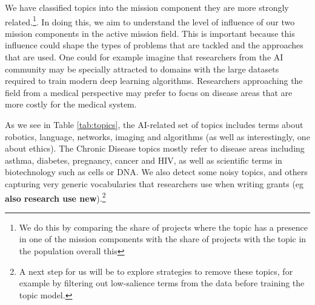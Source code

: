 \documentclass[11pt]{article}
\begin{document}
We have classified topics into the mission component they are more strongly related.\footnote{We do this by comparing the share of projects where the topic has a presence in one of the mission components with the share of projects with the topic in the population overall this}. In doing this, we aim to understand the level of influence of our two mission components in the active mission field. This is important because this influence could shape the types of problems that are tackled and the approaches that are used. One could for example imagine that researchers from the AI community may be specially attracted to domains with the large datasets required to train modern deep learning algorithms. Researchers approaching the field from a medical perspective may prefer to focus on disease areas that are more costly for the medical system. 

As we see in Table \ref{tab:topics}, the AI-related set of topics includes terms about robotics, language, networks, imaging and algorithms (as well as interestingly, one about ethics). The Chronic Disease topics mostly refer to disease areas including asthma, diabetes, pregnancy, cancer and HIV, as well as scientific terms in biotechnology such as cells or DNA. We also detect some noisy topics, and others capturing very generic vocabularies that researchers use when writing grants (eg \textbf{also research use new}).\footnote{A next step for us will be to explore strategies to remove these topics, for example by filtering out low-salience terms from the data before training the topic model.}
\end{document}
